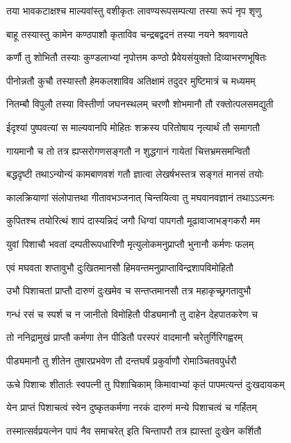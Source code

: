 \twolineshloka
{तया भावकटाक्षश्च माल्यवांस्तु वशीकृतः}
{लावण्यरूपसम्पत्या तस्या रूपं नृप शृणु} %

\twolineshloka
{बाहू तस्यास्तु कामेन कण्ठपाशौ कृताविव}
{चन्द्रबद्वदनं तस्या नयने श्रवणायते} %

\twolineshloka
{कर्णौ तु शोभितौ तस्याः कुण्डलाभ्यां नृपोत्तम}
{कण्ठो प्रैवेयसंयुक्तो दिव्याभरणभूषितः} %

\twolineshloka
{पीनोन्नतौ कुचौ तस्यास्तौ हेमकलशाविव}
{अतिक्षामं तदुदर मुष्टिमात्रं च मध्यमम्} %

\twolineshloka
{नितम्बौ विपुलौ तस्या विस्तीर्णा जघनस्थलम्}
{चरणौ शोभमानौ तौ रक्तोत्पलसमद्युती} %

\twolineshloka
{ईदृश्यां पुष्पवत्यां स माल्यवानपि मोहितः}
{शक्रस्य परितोषाय नृत्यार्थं तौ समागतौ} %

\twolineshloka
{गायमानौ च तो तत्र ह्यप्सरोगणसङ्गतौ}
{न शुद्धगानं गायेतां चित्तभ्रमसमन्वितौ} %

\twolineshloka
{बद्धदृष्टी तथाऽन्योन्यं कामबाणवशं गतौ}
{ज्ञात्वा लेखर्षभस्तत्र सङ्गतं मानसं तयोः} %

\twolineshloka
{कालक्रियाणां संलोपात्तथा गीतावभञ्जनात्}
{चिन्तयित्वा तु मघवानवज्ञानं तथाऽऽत्मनः} %

\twolineshloka
{कुपितश्च तयोरित्थं शापं दास्यन्निदं जगौ}
{धिग्वां पापगतौ मूढावाजाभङ्गकरौ मम} %

\twolineshloka
{युवां पिशाचौ भवतां दम्पतीरूपधारिणौ}
{मृत्युलोकमनुप्राप्तौ भुनानौ कर्मणः फलम्} %

\twolineshloka
{एवं मघवता शप्तावुभौ दुःखितमानसौ}
{हिमवन्तमनुप्राप्ताविन्द्रशापविमोहितौ} %

\twolineshloka
{उभौ पिशाचतां प्राप्तौ दारुणं दुःखमेव च}
{सन्तप्तमानसौ तत्र महाकृच्छ्रगतावुभौ} %

\twolineshloka
{गन्धं रसं च स्पर्श च न जानीतो विमोहितौ}
{पीड्यमानौ तु दाहेन देहपातकरेण च} %

\twolineshloka
{तो ननिद्रामुखं प्राप्तौ कर्मणा तेन पीडितौ}
{परस्परं वादमानौ चरेतुर्गिरिगह्वरम्} %

\twolineshloka
{पीड्यमानौ तु शीतेन तुषारप्रभवेण तौ}
{दन्तघर्षं प्रकुर्वाणौ रोमाञ्चितवपुर्धरौ} %

\twolineshloka
{ऊचे पिशाचः शीतार्तः स्वपत्नी तु पिशाचिकाम्}
{किमावाभ्यां कृतं पापमत्यन्तं दुःखदायकम्} %

\twolineshloka
{येन प्राप्तं पिशाचत्वं स्वेन दुष्कृतकर्मणा}
{नरकं दारुणं मन्ये पिशाचत्वं च गर्हितम्} %

\twolineshloka
{तस्मात्सर्वप्रयत्नेन पापं नैव समाचरेत्}
{इति चिन्तापरौ तत्र ह्यास्तां दुःखेन कर्शितौ} %

